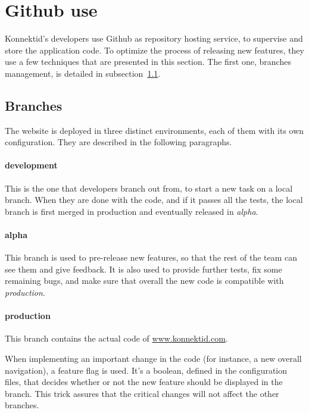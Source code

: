 \section{Github use}
\label{sec:github}

Konnektid's developers use Github as repository hosting service, to supervise and store the application code. To optimize the process of releasing new features, they use a few techniques that are presented in this section. The first one, branches management, is detailed in {\sc subsection}~\ref{ssec:branches}.

\subsection{Branches}
\label{ssec:branches}

The website is deployed in three distinct environments, each of them with its own configuration. They are described in the following paragraphs. 

\paragraph{development} This is the one that developers branch out from, to start a new task on a local branch. When they are done with the code, and if it passes all the tests, the local branch is first merged in production and eventually released in \textit{alpha}.

\paragraph{alpha} This branch is used to pre-release new features, so that the rest of the team can see them and give feedback. It is also used to provide further tests, fix some remaining bugs, and make sure that overall the new code is compatible with \textit{production}.

\paragraph{production} This branch contains the actual code of \url{www.konnektid.com}.

When implementing an important change in the code (for instance, a new overall navigation), a \guillemotleft{} feature flag \guillemotright{} is used. It's a boolean, defined in the configuration files, that decides whether or not the new feature should be displayed in the branch. This trick assures that the critical changes will not affect the other branches.


